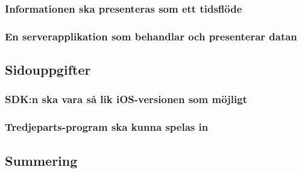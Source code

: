 \subsubsection{Informationen ska presenteras som ett tidsflöde}
\subsubsection{En serverapplikation som behandlar och presenterar datan}
\subsection{Sidouppgifter}
\subsubsection{SDK:n ska vara så lik iOS-versionen som möjligt}
\subsubsection{Tredjeparts-program ska kunna spelas in}
\subsection{Summering}
